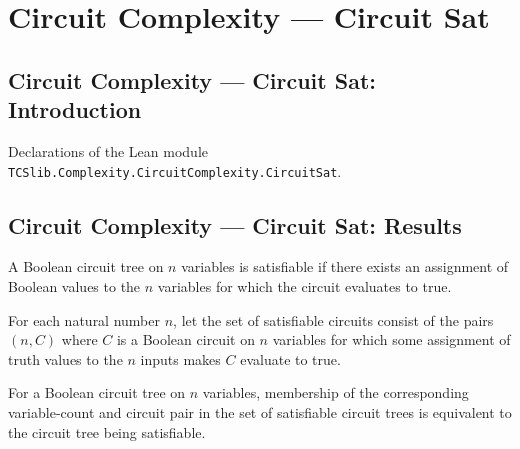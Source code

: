 \section{Circuit Complexity --- Circuit Sat}
\subsection*{Circuit Complexity --- Circuit Sat: Introduction}

Declarations of the Lean module \texttt{TCSlib.Complexity.CircuitComplexity.CircuitSat}.

\subsection*{Circuit Complexity --- Circuit Sat: Results}

\begin{definition}
\label{BoolCircuit.TreeCircuit.Satisfiable}
\leanok
{}
A Boolean circuit tree on $n$ variables is satisfiable if there exists an assignment of
Boolean values to the $n$ variables for which the circuit evaluates to true.
\end{definition}

\begin{definition}
\label{BoolCircuit.CktSat}
\leanok
{}
For each natural number $n$, let the set of satisfiable circuits consist of the pairs
$(n,C)$ where $C$ is a Boolean circuit on $n$ variables for which some assignment of
truth values to the $n$ inputs makes $C$ evaluate to true.
\end{definition}

\begin{theorem}
\label{BoolCircuit.mem_cktSat_iff}
\leanok
{}
For a Boolean circuit tree on $n$ variables, membership of the corresponding
variable-count and circuit pair in the set of satisfiable circuit trees is equivalent to
the circuit tree being satisfiable.
\end{theorem}


